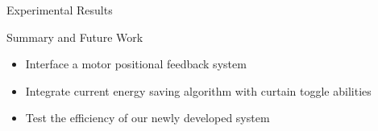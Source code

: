 \documentclass[final]{beamer}
\newlength{\onecolwid}
\begin{document}
\begin{frame}[t]
\begin{columns}[t]
\begin{column}{\onecolwid}
\begin{block}{Experimental Results}
\begin{figure}
\end{figure}






\end{block}





\begin{alertblock}{Summary and Future Work}
\begin{itemize}
    \item Interface a motor positional feedback system
    \item Integrate current energy saving algorithm with curtain toggle abilities
    \item Test the efficiency of our newly developed system 
\end{itemize}


\end{alertblock}

\end{column} %

\end{columns} %

\end{frame} %
\end{document}
